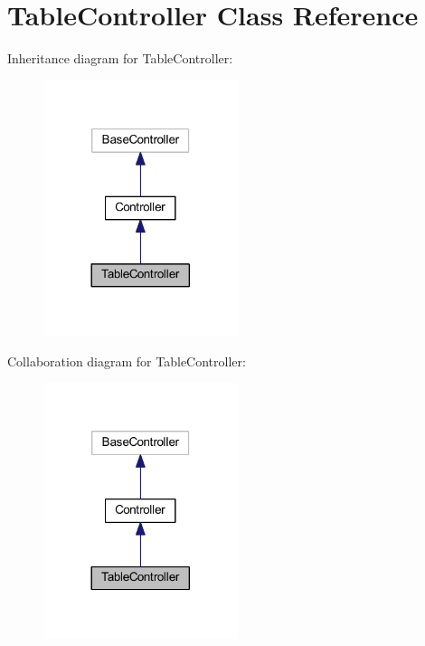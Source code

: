 \hypertarget{class_app_1_1_http_1_1_controllers_1_1_table_controller}{}\section{Table\+Controller Class Reference}
\label{class_app_1_1_http_1_1_controllers_1_1_table_controller}


Inheritance diagram for Table\+Controller\+:
\nopagebreak
\begin{figure}[H]
\begin{center}
\leavevmode
\includegraphics[width=161pt]{class_app_1_1_http_1_1_controllers_1_1_table_controller__inherit__graph}
\end{center}
\end{figure}


Collaboration diagram for Table\+Controller\+:
\nopagebreak
\begin{figure}[H]
\begin{center}
\leavevmode
\includegraphics[width=161pt]{class_app_1_1_http_1_1_controllers_1_1_table_controller__coll__graph}
\end{center}
\end{figure}

